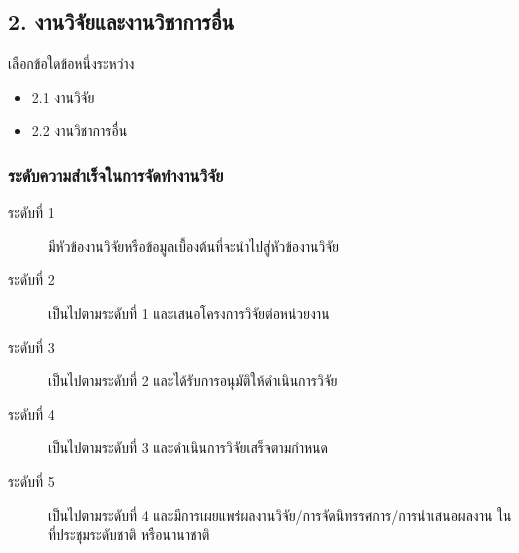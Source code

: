 \documentclass[a4paper,12pt,english]{sphinxmanual}
\begin{document}
\subsection{2. งานวิจัยและงานวิชาการอื่น}
\label{\detokenize{submission_part1:id12}}
เลือกข้อใดข้อหนึ่งระหว่าง
\begin{itemize}
\item {} 
2.1 งานวิจัย

\item {} 
2.2 งานวิชาการอื่น

\end{itemize}


\subsubsection{ระดับความสำเร็จในการจัดทำงานวิจัย}
\label{\detokenize{submission_part1:id13}}\begin{description}
\item[{ระดับที่ 1}] \leavevmode
มีหัวข้องานวิจัยหรือข้อมูลเบื้องต้นที่จะนำไปสู่หัวข้องานวิจัย

\item[{ระดับที่ 2}] \leavevmode
เป็นไปตามระดับที่ 1 และเสนอโครงการวิจัยต่อหน่วยงาน

\item[{ระดับที่ 3}] \leavevmode
เป็นไปตามระดับที่ 2 และได้รับการอนุมัติให้ดำเนินการวิจัย

\item[{ระดับที่ 4}] \leavevmode
เป็นไปตามระดับที่ 3 และดำเนินการวิจัยเสร็จตามกำหนด

\item[{ระดับที่ 5}] \leavevmode
เป็นไปตามระดับที่ 4 และมีการเผยแพร่ผลงานวิจัย/การจัดนิทรรศการ/การนำเสนอผลงาน ในที่ประชุมระดับชาติ หรือนานาชาติ

\end{description}
\end{document}
